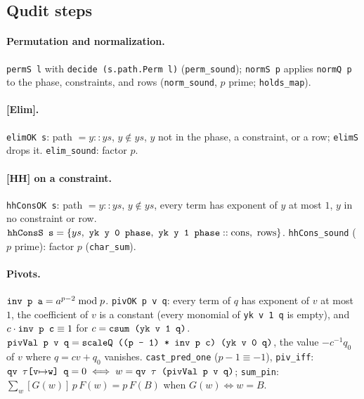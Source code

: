 \subsection{Qudit steps}

\paragraph{Permutation and normalization.} \textnormal{\texttt{permS l}} with \textnormal{\texttt{decide (\allowbreak{}s.\allowbreak{}path.\allowbreak{}Perm l)}}
(\textnormal{\texttt{perm\_\allowbreak{}sound}}); \textnormal{\texttt{normS p}} applies \textnormal{\texttt{normQ p}} to the phase, constraints, and rows
(\textnormal{\texttt{norm\_\allowbreak{}sound}}, $p$ prime; \textnormal{\texttt{holds\_\allowbreak{}map}}).

\paragraph{[Elim].} \textnormal{\texttt{elimOK s}}: path $=y::ys$, $y\notin ys$, $y$ not in the phase, a
constraint, or a row; \textnormal{\texttt{elimS}} drops it. \textnormal{\texttt{elim\_\allowbreak{}sound}}: factor $p$.

\paragraph{[HH] on a constraint.} \textnormal{\texttt{hhConsOK s}}: path $=y::ys$, $y\notin ys$, every term has
exponent of $y$ at most $1$, $y$ in no constraint or row.
$\textnormal{\texttt{hhConsS s}} = \{ys,\ \textnormal{\texttt{yk y 0 phase}},\ \textnormal{\texttt{yk y 1 phase}} :: \text{cons},\ \text{rows}\}$.
\textnormal{\texttt{hhCons\_\allowbreak{}sound}} ($p$ prime): factor $p$ (\textnormal{\texttt{char\_\allowbreak{}sum}}).

\paragraph{Pivots.} $\textnormal{\texttt{inv p a}} = a^{p-2}\bmod p$. \textnormal{\texttt{pivOK p v q}}: every term of $q$ has
exponent of $v$ at most $1$, the coefficient of $v$ is a constant (every monomial of
\textnormal{\texttt{yk v 1 q}} is empty), and $c\cdot\textnormal{\texttt{inv p c}}\equiv1$ for $c = \textnormal{\texttt{csum (\allowbreak{}yk v 1 q)}}$.
$\textnormal{\texttt{pivVal p v q}} = \textnormal{\texttt{scaleQ (\allowbreak{}(\allowbreak{}p -{} 1) * inv p c) (\allowbreak{}yk v 0 q)}}$, the value $-c^{-1}q_0$ of $v$
where $q = cv+q_0$ vanishes. \textnormal{\texttt{cast\_\allowbreak{}pred\_\allowbreak{}one}} ($p-1\equiv-1$), \textnormal{\texttt{piv\_\allowbreak{}iff}}:
$\textnormal{\texttt{qv \ensuremath{\tau}[v\ensuremath{\mapsto}w] q}} = 0\iff w = \textnormal{\texttt{qv \ensuremath{\tau} (\allowbreak{}pivVal p v q)}}$; \textnormal{\texttt{sum\_\allowbreak{}pin}}:
$\sum_w[G(w)]\,p\,F(w) = p\,F(B)$ when $G(w)\iff w=B$.

